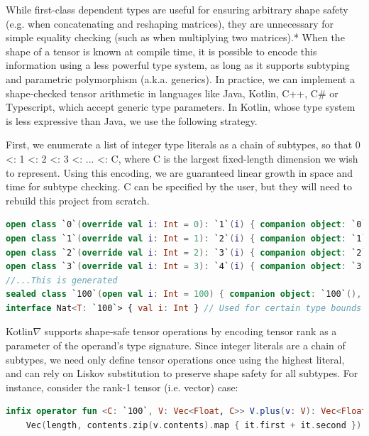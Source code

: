 \documentclass[12pt,initial,twoside,maitrise]{dms}
\numberwithin{equation}{section}
\numberwithin{table}{chapter}
\numberwithin{figure}{chapter}
\begin{document}
While first-class dependent types are useful for ensuring arbitrary shape safety (e.g. when concatenating and reshaping matrices), they are unnecessary for simple equality checking (such as when multiplying two matrices).* When the shape of a tensor is known at compile time, it is possible to encode this information using a less powerful type system, as long as it supports subtyping and parametric polymorphism (a.k.a. generics). In practice, we can implement a shape-checked tensor arithmetic in languages like Java, Kotlin, C++, C# or Typescript, which accept generic type parameters. In Kotlin, whose type system is less expressive than Java, we use the following strategy.

First, we enumerate a list of integer type literals as a chain of subtypes, so that 0 <: 1 <: 2 <: 3 <: ... <: C, where C is the largest fixed-length dimension we wish to represent. Using this encoding, we are guaranteed linear growth in space and time for subtype checking. C can be specified by the user, but they will need to rebuild this project from scratch.

\begin{lstlisting}[caption={Simple code listing.}, language=Kotlin]
open class `0`(override val i: Int = 0): `1`(i) { companion object: `0`(), Nat<`0`> }
open class `1`(override val i: Int = 1): `2`(i) { companion object: `1`(), Nat<`1`> }
open class `2`(override val i: Int = 2): `3`(i) { companion object: `2`(), Nat<`2`> }
open class `3`(override val i: Int = 3): `4`(i) { companion object: `3`(), Nat<`3`> }
//...This is generated
sealed class `100`(open val i: Int = 100) { companion object: `100`(), Nat<`100`> }
interface Nat<T: `100`> { val i: Int } // Used for certain type bounds
\end{lstlisting}

Kotlin$\nabla$ supports shape-safe tensor operations by encoding tensor rank as a parameter of the operand’s type signature. Since integer literals are a chain of subtypes, we need only define tensor operations once using the highest literal, and can rely on Liskov substitution to preserve shape safety for all subtypes. For instance, consider the rank-1 tensor (i.e. vector) case:

\begin{lstlisting}[caption={Simple code listing.}, language=Kotlin]
infix operator fun <C: `100`, V: Vec<Float, C>> V.plus(v: V): Vec<Float, C> =
    Vec(length, contents.zip(v.contents).map { it.first + it.second })
\end{lstlisting}
\end{document}
